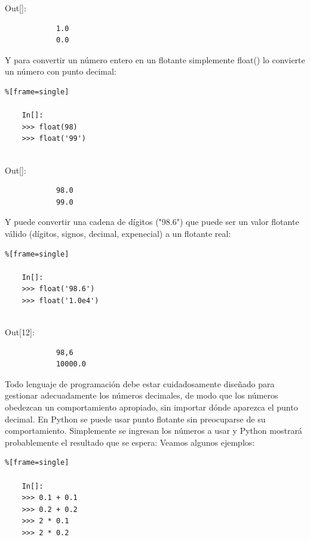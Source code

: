 {\ttfamily\scriptsize\scriptsize 
	\hspace{-0.65cm}Out[]:\vspace{-0.15cm}	
	{\color{blue} 	
		\begin{verbatim}
			1.0
			0.0
		\end{verbatim}
}}


Y para convertir un número entero en un flotante simplemente   {\ttfamily float()} lo convierte  un número con punto decimal:

\begin{lstlisting}%[frame=single]
	
	In[]:	
	>>> float(98)
	>>> float('99')
	
\end{lstlisting}

{\ttfamily\scriptsize\scriptsize 
	\hspace{-0.65cm}Out[]:\vspace{-0.15cm}	
	{\color{blue} 	
		\begin{verbatim}
			98.0
			99.0
		\end{verbatim}
}}

Y puede convertir una cadena de dígitos ("98.6") que puede  ser un valor flotante válido (dígitos,
signos, decimal, expenecial) a un flotante real:
\begin{lstlisting}%[frame=single]
	
	In[]:	
	>>> float('98.6')
	>>> float('1.0e4')
	
\end{lstlisting}

{\ttfamily\scriptsize\scriptsize 
	\hspace{-0.65cm}Out[12]:\vspace{-0.15cm}	
	{\color{blue} 	
		\begin{verbatim}
			98,6
			10000.0
		\end{verbatim}
}}

Todo lenguaje de programación debe estar cuidadosamente diseñado para gestionar adecuadamente los números decimales, de modo que los números obedezcan  un comportamiento apropiado, sin importar dónde aparezca el punto decimal. En Python  se puede usar punto flotante sin preocuparse de su comportamiento. Simplemente se ingresan los números a usar y Python mostrará  probablemente el resultado que se espera: Veamos algunos ejemplos:

\begin{lstlisting}%[frame=single]
	
	In[]:
	>>> 0.1 + 0.1
	>>> 0.2 + 0.2
	>>> 2 * 0.1
	>>> 2 * 0.2
	
\end{lstlisting}


